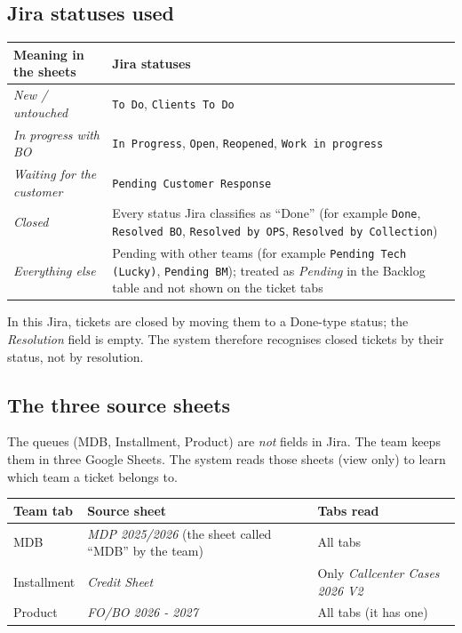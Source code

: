 \documentclass[11pt,a4paper]{article}
\newcommand{\code}[1]{\texttt{#1}}
\let\oldsubsection\subsection
\renewcommand{\subsection}{\needspace{7\baselineskip}\oldsubsection}
\begin{document}
\subsection{Jira statuses used}
\begin{tabularx}{\linewidth}{@{}l L@{}}
\toprule
\textbf{Meaning in the sheets} & \textbf{Jira statuses} \\
\midrule
\emph{New / untouched} & \code{To Do}, \code{Clients To Do} \\
\emph{In progress with BO} & \code{In Progress}, \code{Open}, \code{Reopened}, \code{Work in progress} \\
\emph{Waiting for the customer} & \code{Pending Customer Response} \\
\emph{Closed} & Every status Jira classifies as ``Done'' (for example \code{Done}, \code{Resolved BO},
\code{Resolved by OPS}, \code{Resolved by Collection}) \\
\emph{Everything else} & Pending with other teams (for example \code{Pending Tech (Lucky)}, \code{Pending BM});
treated as \emph{Pending} in the Backlog table and not shown on the ticket tabs \\
\bottomrule
\end{tabularx}

\begin{warning}
In this Jira, tickets are closed by moving them to a Done-type status; the \emph{Resolution} field is empty. The system
therefore recognises closed tickets by their status, not by resolution.
\end{warning}

\subsection{The three source sheets}
The queues (MDB, Installment, Product) are \emph{not} fields in Jira. The team keeps them in three Google Sheets. The
system reads those sheets (view only) to learn which team a ticket belongs to.

\begin{tabularx}{\linewidth}{@{}l L L@{}}
\toprule
\textbf{Team tab} & \textbf{Source sheet} & \textbf{Tabs read} \\
\midrule
MDB & \emph{MDP 2025/2026} (the sheet called ``MDB'' by the team) & All tabs \\
Installment & \emph{Credit Sheet} & Only \emph{Callcenter Cases 2026 V2} \\
Product & \emph{FO/BO 2026 - 2027} & All tabs (it has one) \\
\bottomrule
\end{tabularx}
\end{document}
